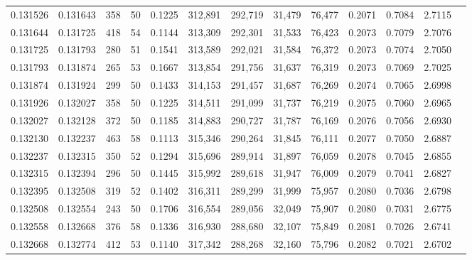 \begin{tabular}{rrrrrrrrrrrrr}
0.131526 & 0.131643 &   358 &  50 &                                     0.1225 & 312,891 & 292,719 &  31,479 &  76,477 & 0.2071 & 0.7084 & 2.7115 \\
0.131644 & 0.131725 &   418 &  54 &                                     0.1144 & 313,309 & 292,301 &  31,533 &  76,423 & 0.2073 & 0.7079 & 2.7076 \\
0.131725 & 0.131793 &   280 &  51 &                                     0.1541 & 313,589 & 292,021 &  31,584 &  76,372 & 0.2073 & 0.7074 & 2.7050 \\
0.131793 & 0.131874 &   265 &  53 &                                     0.1667 & 313,854 & 291,756 &  31,637 &  76,319 & 0.2073 & 0.7069 & 2.7025 \\
0.131874 & 0.131924 &   299 &  50 &                                     0.1433 & 314,153 & 291,457 &  31,687 &  76,269 & 0.2074 & 0.7065 & 2.6998 \\
0.131926 & 0.132027 &   358 &  50 &                                     0.1225 & 314,511 & 291,099 &  31,737 &  76,219 & 0.2075 & 0.7060 & 2.6965 \\
0.132027 & 0.132128 &   372 &  50 &                                     0.1185 & 314,883 & 290,727 &  31,787 &  76,169 & 0.2076 & 0.7056 & 2.6930 \\
0.132130 & 0.132237 &   463 &  58 &                                     0.1113 & 315,346 & 290,264 &  31,845 &  76,111 & 0.2077 & 0.7050 & 2.6887 \\
0.132237 & 0.132315 &   350 &  52 &                                     0.1294 & 315,696 & 289,914 &  31,897 &  76,059 & 0.2078 & 0.7045 & 2.6855 \\
0.132315 & 0.132394 &   296 &  50 &                                     0.1445 & 315,992 & 289,618 &  31,947 &  76,009 & 0.2079 & 0.7041 & 2.6827 \\
0.132395 & 0.132508 &   319 &  52 &                                     0.1402 & 316,311 & 289,299 &  31,999 &  75,957 & 0.2080 & 0.7036 & 2.6798 \\
0.132508 & 0.132554 &   243 &  50 &                                     0.1706 & 316,554 & 289,056 &  32,049 &  75,907 & 0.2080 & 0.7031 & 2.6775 \\
0.132558 & 0.132668 &   376 &  58 &                                     0.1336 & 316,930 & 288,680 &  32,107 &  75,849 & 0.2081 & 0.7026 & 2.6741 \\
0.132668 & 0.132774 &   412 &  53 &                                     0.1140 & 317,342 & 288,268 &  32,160 &  75,796 & 0.2082 & 0.7021 & 2.6702 \\

\end{tabular}
